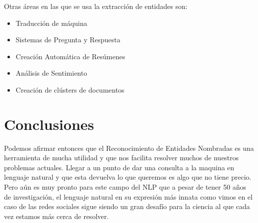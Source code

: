 \documentclass[runningheads]{llncs}
\begin{document}
Otras áreas en las que se usa la extracción de entidades son: \cite{ner_thesis}

\begin{itemize}

\item Traducción de máquina
\item Sistemas de Pregunta y Respuesta
\item Creación Automática de Resúmenes
\item Análisis de Sentimiento
\item Creación de clústers de documentos

\end{itemize}

\section{Conclusiones}


Podemos afirmar entonces que el Reconocimiento de Entidades Nombradas es una herramienta de mucha utilidad y que nos facilita resolver muchos de nuestros problemas actuales. Llegar a un punto de dar una consulta a la maquina en lenguaje natural y que esta devuelva lo que queremos es algo que no tiene precio. Pero aún es muy pronto para este campo del NLP que a pesar de tener 50 años de investigación, el lenguaje natural en su expresión más innata como vimos en el caso de las redes sociales sigue siendo un gran desafío para la ciencia al que cada vez estamos más cerca de resolver.
\end{document}
